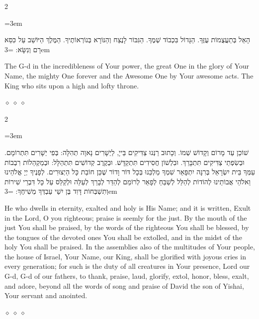 \documentclass[11pt, openany]{book}
\newenvironment{bilingual}{%
  \par\vspace{4pt}%
  \begin{paracol}{2}%
}{%
  \end{paracol}%
  \par\vspace{2pt}%
}
\newenvironment{hebrewcol}{%
  \switchcolumn[1]%
  \begingroup
  \RTL
  \hebrewfont\large
  \setstretch{1.4}%
  \emergencystretch=3em
  \tolerance=9999
  \parindent=0pt\relax
}{%
  \endRTL
  \endgroup
}
\newenvironment{englishcol}{%
  \switchcolumn[0]%
  \begingroup
  \setstretch{1.4}%
  \emergencystretch=3em
  \tolerance=9999
  \normalsize
  \rightskip=0.12in\relax
}{%
  \endgroup
}
\newcommand{\parasep}{%
  \par\vspace{3pt}
  \begin{center}
    \textcolor{sedergold!50}{\tiny$\diamond\;\diamond\;\diamond$}
  \end{center}
  \par\vspace{3pt}
}
\begin{document}
\begin{bilingual}
\begin{hebrewcol}
הָאֵל בְּתַעֲצֻמוֹת עֻזֶּךָ. הַגָּדוֹל בִּכְבוֹד שְׁמֶךָ. הַגִּבּוֹר לָנֶצַח וְהַנּוֹרָא בְּנוֹרְאוֹתֶיךָ. הַמֶּלֶךְ הַיּוֹשֵׁב עַל כִּסֵּא רָם וְנִשָּׂא:
\end{hebrewcol}
\begin{englishcol}
The G-d in the incredibleness of Your power, the great One in the glory of Your Name, the mighty One forever and the Awesome One by Your awesome acts. The King who sits upon a high and lofty throne.
\end{englishcol}
\end{bilingual}
\parasep

\begin{bilingual}
\begin{hebrewcol}
שׁוֹכֵן עַד מָרוֹם וְקָדוֹשׁ שְׁמוֹ. וְכָתוּב רַנְּנוּ צַדִּיקִים בַּייָ, לַיְשָׁרִים נָאוָה תְהִלָּה: בְּפִי יְשָׁרִים תִּתְרוֹמָם. וּבְשִׂפְתֵי צַדִּיקִים תִּתְבָּרֵךְ. וּבִלְשׁוֹן חֲסִידִים תִּתְקַדָּשׁ. וּבְקֶרֶב קְדוֹשִׁים תִּתְהַלָּל: וּבְמַקְהֵלוֹת רִבְבוֹת עַמְּךָ בֵּית יִשְׂרָאֵל בְּרִנָּה יִתְפָּאֵר שִׁמְךָ מַלְכֵּנוּ בְּכָל דּוֹר וָדוֹר שֶׁכֵּן חוֹבַת כָּל הַיְצוּרִים. לְפָנֶיךָ יְיָ אֱלֹהֵינוּ וֵאלֹהֵי אֲבוֹתֵינוּ לְהוֹדוֹת לְהַלֵּל לְשַׁבֵּחַ לְפָאֵר לְרוֹמֵם לְהַדֵּר לְבָרֵךְ לְעַלֵּה וּלְקַלֵּס עַל כָּל דִּבְרֵי שִׁירוֹת וְתִשְׁבְּחוֹת דָּוִד בֶּן יִשַׁי עַבְדְּךָ מְשִׁיחֶךָ:
\end{hebrewcol}
\begin{englishcol}
He who dwells in eternity, exalted and holy is His Name; and it is written, Exult in the Lord, O you righteous; praise is seemly for the just. By the mouth of the just You shall be praised, by the words of the righteous You shall be blessed, by the tongues of the devoted ones You shall be extolled, and in the midst of the holy You shall be praised. In the assemblies also of the multitudes of Your people, the house of Israel, Your Name, our King, shall be glorified with joyous cries in every generation; for such is the duty of all creatures in Your presence, Lord our G-d, G-d of our fathers, to thank, praise, laud, glorify, extol, honor, bless, exalt, and adore, beyond all the words of song and praise of David the son of Yishai, Your servant and anointed.
\end{englishcol}
\end{bilingual}
\parasep
\end{document}
